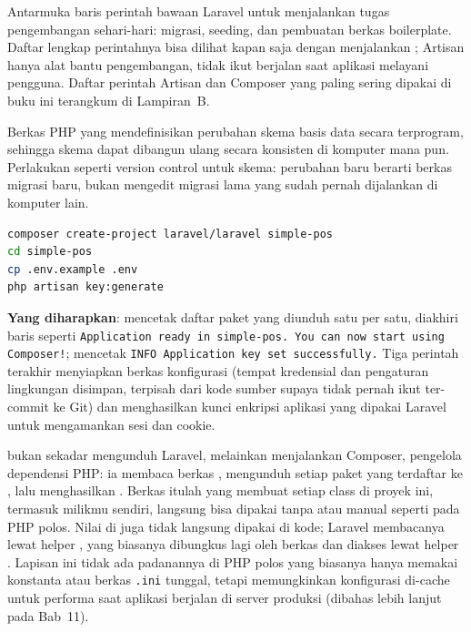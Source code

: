 \begin{istilahpenting}
\begin{description}[leftmargin=0pt,style=nextline]
  \item[Artisan] Antarmuka baris perintah bawaan Laravel untuk menjalankan tugas pengembangan sehari-hari: migrasi, seeding, dan pembuatan berkas boilerplate. Daftar lengkap perintahnya bisa dilihat kapan saja dengan menjalankan ; Artisan hanya alat bantu pengembangan, tidak ikut berjalan saat aplikasi melayani pengguna. Daftar perintah Artisan dan Composer yang paling sering dipakai di buku ini terangkum di Lampiran~B.
  \item[Migrasi] Berkas PHP yang mendefinisikan perubahan skema basis data secara terprogram, sehingga skema dapat dibangun ulang secara konsisten di komputer mana pun. Perlakukan seperti version control untuk skema: perubahan baru berarti berkas migrasi baru, bukan mengedit migrasi lama yang sudah pernah dijalankan di komputer lain.
\end{description}
\end{istilahpenting}

\begin{lstlisting}[language=bash]
composer create-project laravel/laravel simple-pos
cd simple-pos
cp .env.example .env
php artisan key:generate
\end{lstlisting}

\textbf{Yang diharapkan}:  mencetak daftar
paket yang diunduh satu per satu, diakhiri baris seperti
\texttt{Application ready in simple-pos. You can now start using
Composer!};  mencetak
\texttt{INFO Application key set successfully.} Tiga perintah terakhir
menyiapkan berkas konfigurasi  (tempat kredensial dan
pengaturan lingkungan disimpan, terpisah dari kode sumber supaya tidak
pernah ikut ter-commit ke Git) dan menghasilkan kunci enkripsi aplikasi
yang dipakai Laravel untuk mengamankan sesi dan cookie.

 bukan sekadar mengunduh Laravel, melainkan
menjalankan Composer, pengelola dependensi PHP: ia membaca berkas
, mengunduh setiap paket yang terdaftar ke
, lalu menghasilkan . Berkas
itulah yang membuat setiap class di proyek ini, termasuk milikmu sendiri,
langsung bisa dipakai tanpa  atau  manual
seperti pada PHP polos. Nilai di  juga tidak langsung dipakai
di kode; Laravel membacanya lewat helper , yang biasanya
dibungkus lagi oleh berkas  dan diakses lewat helper
. Lapisan ini tidak ada padanannya di PHP polos yang
biasanya hanya memakai konstanta atau berkas \texttt{.ini} tunggal, tetapi
memungkinkan konfigurasi di-cache untuk performa saat aplikasi berjalan
di server produksi (dibahas lebih lanjut pada Bab~11).

